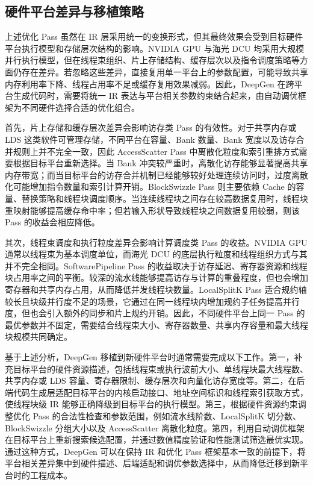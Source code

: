 \subsection{硬件平台差异与移植策略}

上述优化 Pass 虽然在 IR 层采用统一的变换形式，但其最终效果会受到目标硬件平台执行模型和存储层次结构的影响。NVIDIA GPU 与海光 DCU 均采用大规模并行执行模型，但在线程束组织、片上存储结构、缓存层次以及指令调度策略等方面仍存在差异。若忽略这些差异，直接复用单一平台上的参数配置，可能导致共享内存利用率下降、线程占用率不足或缓存复用效果减弱。因此，DeepGen 在跨平台生成代码时，需要将统一 IR 表达与平台相关参数约束结合起来，由自动调优框架为不同硬件选择合适的优化组合。

首先，片上存储和缓存层次差异会影响访存类 Pass 的有效性。对于共享内存或 LDS 这类软件可管理存储，不同平台在容量、Bank 数量、Bank 宽度以及访存合并规则上并不完全一致，因此 AccessScatter Pass 中离散化粒度和索引重排方式需要根据目标平台重新选择。当 Bank 冲突较严重时，离散化访存能够显著提高共享内存带宽；而当目标平台的访存合并机制已经能够较好处理连续访问时，过度离散化可能增加指令数量和索引计算开销。BlockSwizzle Pass 则主要依赖 Cache 的容量、替换策略和线程块调度顺序。当连续线程块之间存在较高数据复用时，线程块重映射能够提高缓存命中率；但若输入形状导致线程块之间数据复用较弱，则该 Pass 的收益会相应降低。

其次，线程束调度和执行粒度差异会影响计算调度类 Pass 的收益。NVIDIA GPU 通常以线程束为基本调度单位，而海光 DCU 的底层执行粒度和线程组织方式与其并不完全相同。SoftwarePipeline Pass 的收益取决于访存延迟、寄存器资源和线程块占用率之间的平衡。较深的流水线能够提高访存与计算的重叠程度，但也会增加寄存器和共享内存占用，从而降低并发线程块数量。LocalSplitK Pass 适合规约轴较长且块级并行度不足的场景，它通过在同一线程块内增加规约子任务提高并行度，但也会引入额外的同步和片上规约开销。因此，不同硬件平台上同一 Pass 的最优参数并不固定，需要结合线程束大小、寄存器数量、共享内存容量和最大线程块规模共同确定。

基于上述分析，DeepGen 移植到新硬件平台时通常需要完成以下工作。第一，补充目标平台的硬件资源描述，包括线程束或执行波前大小、单线程块最大线程数、共享内存或 LDS 容量、寄存器限制、缓存层次和向量化访存宽度等。第二，在后端代码生成层适配目标平台的内核启动接口、地址空间标识和线程索引获取方式，使线程块级 IR 能够正确降级到目标平台的执行模型。第三，根据硬件资源约束调整优化 Pass 的合法性检查和参数范围，例如流水线阶数、LocalSplitK 切分数、BlockSwizzle 分组大小以及 AccessScatter 离散化粒度。第四，利用自动调优框架在目标平台上重新搜索候选配置，并通过数值精度验证和性能测试筛选最优实现。通过这种方式，DeepGen 可以在保持 IR 和优化 Pass 框架基本一致的前提下，将平台相关差异集中到硬件描述、后端适配和调优参数选择中，从而降低迁移到新平台时的工程成本。


